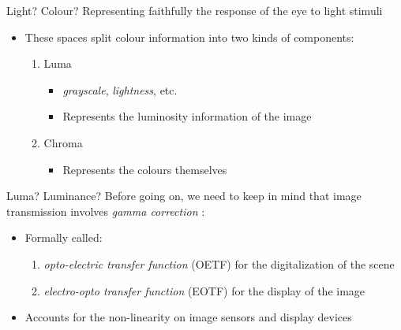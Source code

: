 \documentclass[aspectratio=169,handout,usepdftitle=false]{fireshonks}
\begin{document}
\begin{frame}{Light? Colour?}
    Representing faithfully the response of the eye to light stimuli

    \begin{itemize}
        \item These spaces split colour information into two kinds of components:
              \begin{enumerate}
                  \item Luma
                        \begin{itemize}
                            \item \emph{grayscale}, \emph{lightness}, etc.
                            \item Represents the luminosity information of the image
                        \end{itemize}
                  \item Chroma
                        \begin{itemize}
                            \item Represents the colours themselves
                        \end{itemize}
              \end{enumerate}
    \end{itemize}
\end{frame}
\begin{frame}{Luma? Luminance?}
    Before going on, we need to keep in mind that image transmission involves \emph{gamma correction} \autocite{tooms}:
    \begin{itemize}
        \item Formally called:
              \begin{enumerate}
                  \item \emph{opto-electric transfer function} (OETF) for the digitalization of the scene
                  \item \emph{electro-opto transfer function} (EOTF) for the display of the image
              \end{enumerate}
        \item Accounts for the non-linearity on image sensors and display devices
    \end{itemize}
\end{frame}
\end{document}
